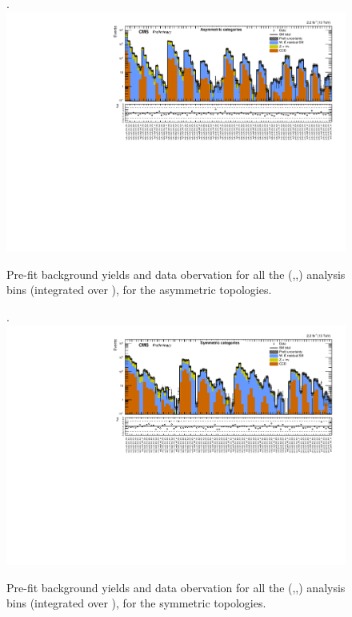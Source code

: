 \clearpage
\begin{landscape}
  \begin{center}
    \begin{figure}[h!]
      \caption{Pre-fit background yields and data obervation for all the (\njet,\nb,\scalht) analysis bins (integrated over \MHT), for the asymmetric topologies. \label{fig:summaryPlot_prefit_Asymmetric}}.
      \includegraphics[width=0.8\linewidth]{figures/postFitResults/summaryPlots/summaryPlot_prefit_Asymmetric}
    \end{figure}
  \end{center}
\end{landscape}

\clearpage
\begin{landscape}
  \begin{center}
    \begin{figure}[h!]
      \caption{Pre-fit background yields and data obervation for all the (\njet,\nb,\scalht) analysis bins (integrated over \MHT), for the symmetric topologies. \label{fig:summaryPlot_prefit_Symmetric}}.
      \includegraphics[width=0.8\linewidth]{figures/postFitResults/summaryPlots/summaryPlot_prefit_Symmetric}
    \end{figure}
  \end{center}
\end{landscape}


